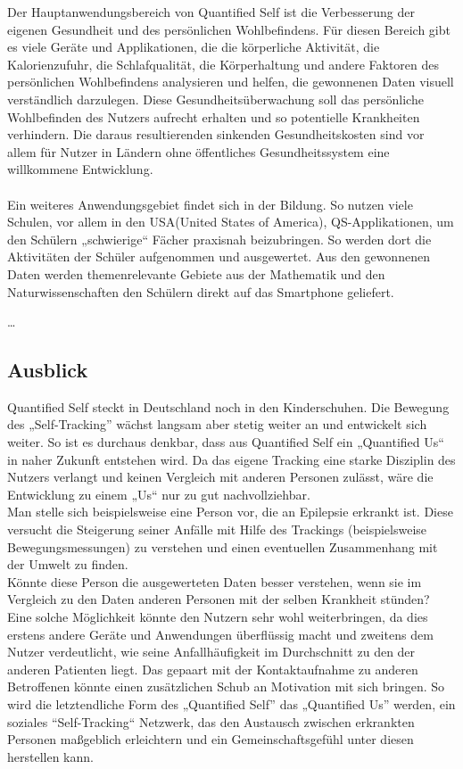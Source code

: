Der Hauptanwendungsbereich von Quantified Self ist die Verbesserung der eigenen Gesundheit und des persönlichen Wohlbefindens. 
Für diesen Bereich gibt es viele Geräte und Applikationen, die die körperliche Aktivität, die Kalorienzufuhr, die Schlafqualität, die Körperhaltung und andere Faktoren des persönlichen Wohlbefindens analysieren und helfen, die gewonnenen Daten visuell verständlich darzulegen. 
Diese Gesundheitsüberwachung soll das persönliche Wohlbefinden des Nutzers aufrecht erhalten und so potentielle Krankheiten verhindern.
Die daraus resultierenden sinkenden Gesundheitskosten sind vor allem für Nutzer in Ländern ohne öffentliches Gesundheitssystem eine willkommene Entwicklung.
\\
\\
Ein weiteres Anwendungsgebiet findet sich in der Bildung. 
So nutzen viele Schulen, vor allem in den USA(United States of America), QS-Applikationen, um den Schülern „schwierige“ Fächer praxisnah beizubringen. 
So werden dort die Aktivitäten der Schüler aufgenommen und ausgewertet.
Aus den gewonnenen Daten werden themenrelevante Gebiete aus der Mathematik und den Naturwissenschaften den Schülern direkt auf das Smartphone geliefert.\cite{web:QSEducation}

\ldots 


\subsection{Ausblick}
\label{ch:Grundlagen:sec:QuantifiedSelf:subsec:Ausblick}

Quantified Self steckt in Deutschland noch in den Kinderschuhen.
Die Bewegung des „Self-Tracking” wächst langsam aber stetig weiter an und entwickelt sich weiter.
So ist es durchaus denkbar, dass aus Quantified Self ein „Quantified Us“ in naher Zukunft entstehen wird.
Da das eigene Tracking eine starke Disziplin des Nutzers verlangt und keinen Vergleich mit anderen Personen zulässt, wäre die Entwicklung zu einem „Us“ nur zu gut nachvollziehbar.
\\
Man stelle sich beispielsweise eine Person vor, die an Epilepsie erkrankt ist. 
Diese versucht die Steigerung seiner Anfälle mit Hilfe des Trackings (beispielsweise Bewegungsmessungen) zu verstehen und einen eventuellen Zusammenhang mit der Umwelt zu finden. \\	
Könnte diese Person die ausgewerteten Daten besser verstehen, wenn sie im Vergleich zu den Daten anderen Personen mit der selben Krankheit stünden? \\
Eine solche Möglichkeit könnte den Nutzern sehr wohl weiterbringen, da dies erstens andere Geräte und Anwendungen überflüssig macht und zweitens dem Nutzer verdeutlicht, wie seine Anfallhäufigkeit im Durchschnitt zu den der anderen Patienten liegt.
Das gepaart mit der Kontaktaufnahme zu anderen Betroffenen könnte einen zusätzlichen Schub an Motivation mit sich bringen. 
So wird die letztendliche Form des „Quantified Self” das „Quantified Us” werden, ein soziales “Self-Tracking“ Netzwerk, das den Austausch zwischen erkrankten Personen maßgeblich erleichtern und ein Gemeinschaftsgefühl unter diesen herstellen kann.

